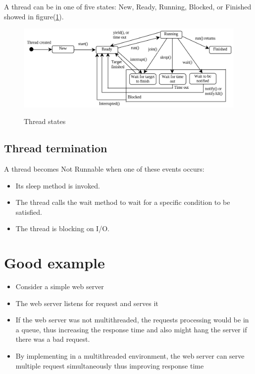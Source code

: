 \documentclass[12pt, a4paper]{book}
\begin{document}
A thread can be in one of five states: New, Ready, Running, Blocked, or Finished showed in figure(\ref{fig:thread-states-detaild}).
\begin{figure}[h]
    \centering
    \includegraphics[width=0.9\linewidth]{figures/thread-states-detaild.png}
    \label{fig:thread-states-detaild}
    \caption{Thread states}
\end{figure}

\subsection{Thread termination}
A thread becomes Not Runnable when one of these events occurs:
\begin{itemize}
    \item  Its sleep method is invoked.
    \item  The thread calls the wait method to wait for a specific condition to be satisfied.
    \item  The thread is blocking on I/O.
\end{itemize}
\section{Good example}
\begin{itemize}
    \item Consider a simple web server
    \item    The web server listens for request and serves it
    \item If the web server was not multithreaded, the requests processing would be in a queue, thus increasing the response time and also might hang the server if there was a bad request.
    \item By implementing in a multithreaded environment, the web server can serve multiple request simultaneously thus improving response time
\end{itemize}
\end{document}
